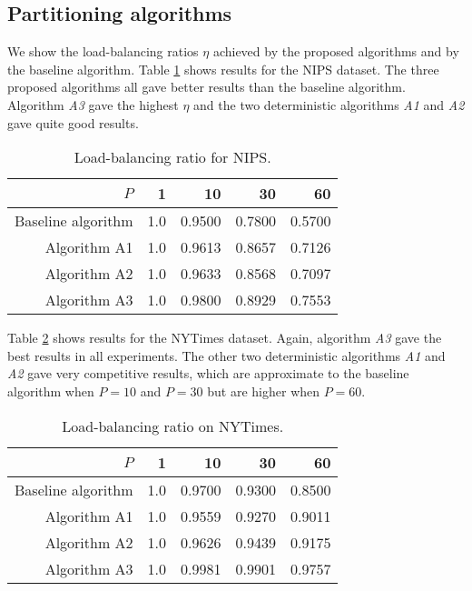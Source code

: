\documentclass[10pt,conference]{IEEEtran}
\begin{document}
\subsection{Partitioning algorithms }
We show the load-balancing ratios $\eta$ achieved by the proposed algorithms and by the baseline algorithm. Table \ref{tab:nips} shows results for the NIPS dataset. The three proposed algorithms all gave better results than the baseline algorithm. Algorithm \textit{A3} gave the highest $\eta$ and the two deterministic algorithms \textit{A1} and \textit{A2} gave quite good results.

\begin{table}[htbp]
  \centering
  \caption{Load-balancing ratio for NIPS.}
    \begin{tabular}{r|r|r|r|r}
    \hline
    $P$ & \textbf{1} & \textbf{10} & \textbf{30} & \textbf{60} \\
    \hline
    Baseline algorithm & 1.0     & 0.9500 & 0.7800 & 0.5700 \\
    Algorithm A1 & 1.0     & 0.9613 & 0.8657 & 0.7126 \\
    Algorithm A2 & 1.0     & 0.9633 & 0.8568 & 0.7097 \\
    Algorithm A3 & 1.0     & 0.9800 & 0.8929 & 0.7553 \\
    \hline
    \end{tabular}\label{tab:nips}\end{table}
Table \ref{tab:nyt} shows results for the NYTimes dataset. Again, algorithm \textit{A3} gave the best results in all experiments. The other two deterministic algorithms \textit{A1} and \textit{A2} gave very competitive results, which are approximate to the baseline algorithm when $P=10$ and $P=30$ but are higher when $P=60$.

\begin{table}[htbp]
  \centering
  \caption{Load-balancing ratio on NYTimes.}
    \begin{tabular}{r|r|r|r|r}
    \hline
	$P$ & \textbf{1} & \textbf{10} & \textbf{30} & \textbf{60} \\
    \hline
    Baseline algorithm & 1.0     & 0.9700 & 0.9300 & 0.8500 \\
    Algorithm A1 & 1.0     & 0.9559 & 0.9270 & 0.9011 \\
    Algorithm A2 & 1.0     & 0.9626 & 0.9439 & 0.9175 \\
    Algorithm A3 & 1.0     & 0.9981 & 0.9901 & 0.9757 \\
    \hline
    \end{tabular}\label{tab:nyt}\end{table}
\end{document}
